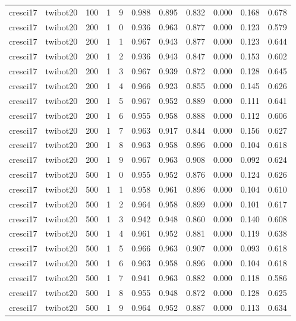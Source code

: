 \begin{tabular}{llrrrrrrrrr}
cresci17 & twibot20 & 100 & 1 & 9 & 0.988 & 0.895 & 0.832 & 0.000 & 0.168 & 0.678 \\
cresci17 & twibot20 & 200 & 1 & 0 & 0.936 & 0.963 & 0.877 & 0.000 & 0.123 & 0.579 \\
cresci17 & twibot20 & 200 & 1 & 1 & 0.967 & 0.943 & 0.877 & 0.000 & 0.123 & 0.644 \\
cresci17 & twibot20 & 200 & 1 & 2 & 0.936 & 0.943 & 0.847 & 0.000 & 0.153 & 0.602 \\
cresci17 & twibot20 & 200 & 1 & 3 & 0.967 & 0.939 & 0.872 & 0.000 & 0.128 & 0.645 \\
cresci17 & twibot20 & 200 & 1 & 4 & 0.966 & 0.923 & 0.855 & 0.000 & 0.145 & 0.626 \\
cresci17 & twibot20 & 200 & 1 & 5 & 0.967 & 0.952 & 0.889 & 0.000 & 0.111 & 0.641 \\
cresci17 & twibot20 & 200 & 1 & 6 & 0.955 & 0.958 & 0.888 & 0.000 & 0.112 & 0.606 \\
cresci17 & twibot20 & 200 & 1 & 7 & 0.963 & 0.917 & 0.844 & 0.000 & 0.156 & 0.627 \\
cresci17 & twibot20 & 200 & 1 & 8 & 0.963 & 0.958 & 0.896 & 0.000 & 0.104 & 0.618 \\
cresci17 & twibot20 & 200 & 1 & 9 & 0.967 & 0.963 & 0.908 & 0.000 & 0.092 & 0.624 \\
cresci17 & twibot20 & 500 & 1 & 0 & 0.955 & 0.952 & 0.876 & 0.000 & 0.124 & 0.626 \\
cresci17 & twibot20 & 500 & 1 & 1 & 0.958 & 0.961 & 0.896 & 0.000 & 0.104 & 0.610 \\
cresci17 & twibot20 & 500 & 1 & 2 & 0.964 & 0.958 & 0.899 & 0.000 & 0.101 & 0.617 \\
cresci17 & twibot20 & 500 & 1 & 3 & 0.942 & 0.948 & 0.860 & 0.000 & 0.140 & 0.608 \\
cresci17 & twibot20 & 500 & 1 & 4 & 0.961 & 0.952 & 0.881 & 0.000 & 0.119 & 0.638 \\
cresci17 & twibot20 & 500 & 1 & 5 & 0.966 & 0.963 & 0.907 & 0.000 & 0.093 & 0.618 \\
cresci17 & twibot20 & 500 & 1 & 6 & 0.963 & 0.958 & 0.896 & 0.000 & 0.104 & 0.618 \\
cresci17 & twibot20 & 500 & 1 & 7 & 0.941 & 0.963 & 0.882 & 0.000 & 0.118 & 0.586 \\
cresci17 & twibot20 & 500 & 1 & 8 & 0.955 & 0.948 & 0.872 & 0.000 & 0.128 & 0.625 \\
cresci17 & twibot20 & 500 & 1 & 9 & 0.964 & 0.952 & 0.887 & 0.000 & 0.113 & 0.634 \\

\end{tabular}
